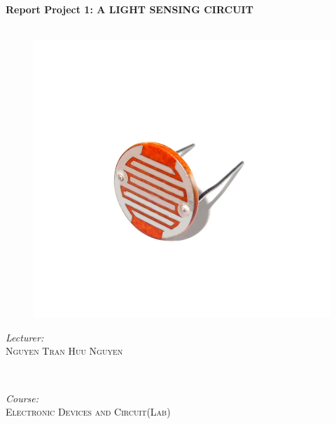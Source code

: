 \documentclass[12pt]{extarticle}
\newcommand{\<}{\langle}
\renewcommand{\>}{\rangle}
\theoremstyle{definition}
\begin{document}
\begin{titlepage}
\begin{figure}[ht]
		
	\end{figure}
	
	\HRule\\[0.4cm]
	
	{\huge\bfseries Report Project 1: A LIGHT SENSING CIRCUIT}\\[0.4cm] %
	
	\HRule\\[0.5cm]
	\begin{figure}[ht]
		\begin{center}
			
			\includegraphics[scale=0.2]{sensor.jpg}\\
			
		\end{center}
	\end{figure}
	
	\begin{minipage}{0.5\textwidth}
		\begin{flushleft}
			\large
			\textit{Lecturer: }\\
			 \textsc{Nguyen Tran Huu Nguyen} %
		\end{flushleft}
	\end{minipage}
	~
	\begin{minipage}{0.4\textwidth}
		\begin{flushright}
			\large
			\textit{Course:}\\
			 \textsc{Electronic Devices and Circuit(Lab)} %
		\end{flushright}
	\end{minipage}
	

\end{titlepage}
\end{document}
